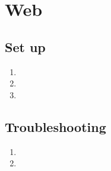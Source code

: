   \section{Web}
  \subsection{Set up}
    \begin{enumerate}
      \item

      \item

      \item


    \end{enumerate}

  \subsection{Troubleshooting}

  \begin{enumerate}
    \item
    \item
  \end{enumerate}
